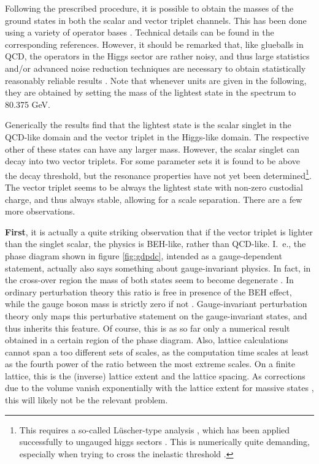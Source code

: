 \documentclass[final,12pt]{article}
\newcommand*{\1}{1\!\!\!\bot}
\begin{document}
Following the prescribed procedure, it is possible to obtain the masses of the ground states in both the scalar and vector triplet channels. This has been done using a variety of operator bases \cite{Wurtz:2013ova,Maas:2013aia,Maas:2014pba,Maas:2012tj,Langguth:1985eu,Langguth:1985dr,Evertz:1986vp,Evertz:1985fc}. Technical details can be found in the corresponding references. However, it should be remarked that, like glueballs in QCD, the operators in the Higgs sector are rather noisy, and thus large statistics and/or advanced noise reduction techniques are necessary to obtain statistically reasonably reliable results \cite{Philipsen:1996af,Wurtz:2013ova,Maas:2014pba}. Note that whenever units are given in the following, they are obtained by setting the mass of the lightest state in the spectrum to 80.375 GeV.

Generically the results \cite{Wurtz:2013ova,Maas:2013aia,Maas:2014pba,Maas:2012tj,Langguth:1985eu,Langguth:1985dr,Evertz:1986vp,Evertz:1985fc,Maas:unpublished} find that the lightest state is the scalar singlet in the QCD-like domain and the vector triplet in the Higgs-like domain. The respective other of these states can have any larger mass. However, the scalar singlet can decay into two vector triplets. For some parameter sets it is found to be above the decay threshold, but the resonance properties have not yet been determined\footnote{This requires a so-called L\"uscher-type analysis \cite{Gattringer:2010zz,Luscher:1990ux,Luscher:1991cf}, which has been applied successfully to ungauged higgs sectors \cite{Zimmermann:1991xx,Gerhold:2011mx}. This is numerically quite demanding, especially when trying to cross the inelastic threshold \cite{Briceno:2014oea,Briceno:2017tce}.}. The vector triplet seems to be always the lightest state with non-zero custodial charge, and thus always stable, allowing for a scale separation. There are a few more observations.

{\bf First}, it is actually a quite striking observation \cite{Langguth:1985eu,Langguth:1985dr,Evertz:1986vp,Evertz:1985fc,Maas:2014pba} that if the vector triplet is lighter than the singlet scalar, the physics is BEH-like, rather than QCD-like. I.\ e., the phase diagram shown in figure \ref{fig:gdpdc}, intended as a gauge-dependent statement, actually also says something about gauge-invariant physics. In fact, in the cross-over region the mass of both states seem to become degenerate \cite{Maas:2014pba}. In ordinary perturbation theory this ratio is free in presence of the BEH effect, while the gauge boson mass is strictly zero if not \cite{Bohm:2001yx}. Gauge-invariant perturbation theory only maps this perturbative statement on the gauge-invariant states, and thus inherits this feature. Of course, this is as so far only a numerical result obtained in a certain region of the phase diagram. Also, lattice calculations cannot span a too different sets of scales, as the computation time scales at least as the fourth power of the ratio between the most extreme scales. On a finite lattice, this is the (inverse) lattice extent and the lattice spacing. As corrections due to the volume vanish exponentially with the lattice extent for massive states \cite{Luscher:1985dn}, this will likely not be the relevant problem.
\end{document}
